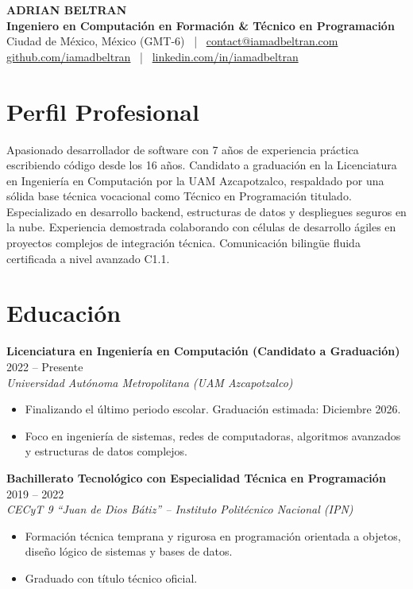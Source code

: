 \documentclass[10pt,a4paper]{article}
\begin{document}
\begin{center}
    {\Huge \textbf{ADRIAN BELTRAN}} \\
    \vspace{4pt}
    {\large \textbf{Ingeniero en Computación en Formación \& Técnico en Programación}} \\
    \vspace{4pt}
    Ciudad de México, México (GMT-6) \ | \ \href{mailto:contact@iamadbeltran.com}{contact@iamadbeltran.com} \\
    \href{https://github.com/iamadbeltran}{github.com/iamadbeltran} \ | \ \href{https://linkedin.com/in/iamadbeltran}{linkedin.com/in/iamadbeltran}
\end{center}

\vspace{6pt}

\section{Perfil Profesional}
Apasionado desarrollador de software con 7 años de experiencia práctica escribiendo código desde los 16 años. Candidato a graduación en la Licenciatura en Ingeniería en Computación por la UAM Azcapotzalco, respaldado por una sólida base técnica vocacional como Técnico en Programación titulado. Especializado en desarrollo backend, estructuras de datos y despliegues seguros en la nube. Experiencia demostrada colaborando con células de desarrollo ágiles en proyectos complejos de integración técnica. Comunicación bilingüe fluida certificada a nivel avanzado C1.1.

\section{Educación}
\noindent
\textbf{Licenciatura en Ingeniería en Computación (Candidato a Graduación)} \hfill 2022 -- Presente \\
\textit{Universidad Autónoma Metropolitana (UAM Azcapotzalco)} \\
\begin{itemize}
    \item Finalizando el último periodo escolar. Graduación estimada: Diciembre 2026.
    \item Foco en ingeniería de sistemas, redes de computadoras, algoritmos avanzados y estructuras de datos complejos.
\end{itemize}

\vspace{6pt}
\noindent
\textbf{Bachillerato Tecnológico con Especialidad Técnica en Programación} \hfill 2019 -- 2022 \\
\textit{CECyT 9 ``Juan de Dios Bátiz'' -- Instituto Politécnico Nacional (IPN)} \\
\begin{itemize}
    \item Formación técnica temprana y rigurosa en programación orientada a objetos, diseño lógico de sistemas y bases de datos.
    \item Graduado con título técnico oficial.
\end{itemize}
\end{document}
